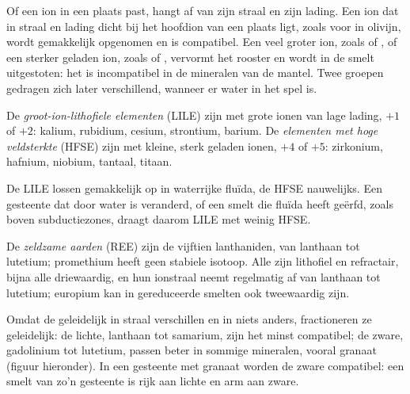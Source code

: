 Of een ion in een plaats past, hangt af van zijn straal en zijn lading. Een ion dat in
straal en lading dicht bij het hoofdion van een plaats ligt, zoals  voor  in
olivijn, wordt gemakkelijk opgenomen en is compatibel. Een veel groter ion, zoals
 of , of een sterker geladen ion, zoals  of
, vervormt het rooster en wordt in de smelt uitgestoten: het is
incompatibel in de mineralen van de mantel. Twee groepen 
gedragen zich later verschillend, wanneer er water in het spel is.

\begin{definition}
\label{def:b2:elements-in-the-earth:lile-hfse}
De \emph{groot-ion-lithofiele elementen}
(LILE) zijn  met grote ionen van lage lading, $+1$ of $+2$:
kalium, rubidium, cesium, strontium, barium. De
\emph{elementen met hoge veldsterkte} (HFSE)
zijn  met kleine, sterk geladen ionen, $+4$ of $+5$:
zirkonium, hafnium, niobium, tantaal, titaan.
\end{definition}

De LILE lossen gemakkelijk op in waterrijke fluïda, de HFSE nauwelijks. Een gesteente
dat door water is veranderd, of een smelt die fluïda heeft geërfd, zoals boven subductiezones,
draagt daarom LILE met weinig HFSE.

\begin{definition}\label{def:b2:elements-in-the-earth:ree}
De \emph{zeldzame aarden} (REE) zijn de vijftien
lanthaniden, van lanthaan tot lutetium; promethium heeft geen stabiele isotoop. Alle
zijn lithofiel en refractair, bijna alle driewaardig, en hun ionstraal
neemt regelmatig af van lanthaan tot lutetium; europium kan in gereduceerde smelten
ook tweewaardig zijn.
\end{definition}

Omdat de  geleidelijk in straal verschillen en in niets anders,
fractioneren ze geleidelijk: de lichte, lanthaan tot samarium, zijn het minst
compatibel; de zware, gadolinium tot lutetium, passen beter in sommige
mineralen, vooral granaat (figuur hieronder). In een gesteente met granaat worden de zware  compatibel: een smelt van zo'n gesteente is rijk aan lichte  en
arm aan zware.

